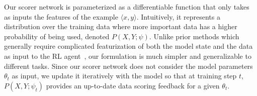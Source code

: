 

Our scorer network is parameterized as a differentiable function that only takes as inputs the features of the example $\langle x, y \rangle$. Intuitively, it represents a distribution over the training data where more important data has a higher probability of being used, denoted $P(X, Y; \psi)$. Unlike prior methods which generally require complicated featurization of both the model state and the data as input to the RL agent~\citep{learn_to_teach,mentornet,learn_active_learn}, our formulation is much simpler and  generalizable to different tasks. Since our scorer network does not consider the model parameters $\theta_t$ as input, we update it iteratively with the model so that at training step $t$, $P(X, Y; \psi_t)$ provides an up-to-date data scoring feedback for a given $\theta_t$. %

